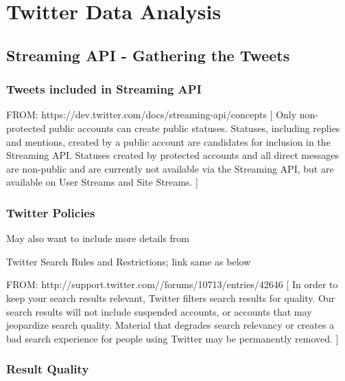 \documentclass[12pt,a4paper]{report}
\begin{document}
\chapter{Twitter Data Analysis}

\section{Streaming API - Gathering the Tweets}

\subsection{Tweets included in Streaming API}

FROM: https://dev.twitter.com/docs/streaming-api/concepts
[
Only non-protected public accounts can create public statuses. 
Statuses, including replies and mentions, created by a public 
account are candidates for inclusion in the Streaming API. Statuses 
created by protected accounts and all direct messages are non-public 
and are currently not available via the Streaming API, but are 
available on User Streams and Site Streams.
]

\subsection{Twitter Policies}

May also want to include more details from

Twitter Search Rules and Restrictions; link same as below

FROM: http://support.twitter.com//forums/10713/entries/42646
[
In order to keep your search results relevant, Twitter filters search 
results for quality. Our search results will not include suspended accounts, 
or accounts that may jeopardize search quality. Material that degrades 
search relevancy or creates a bad search experience for 
people using Twitter may be permanently removed.
]
\subsection{Result Quality}
\end{document}
